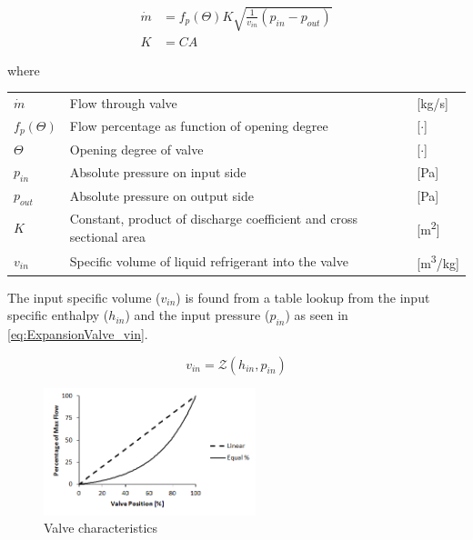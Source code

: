 \begin{equation} \label{eq:ExpansionValve_Alt}
	\begin{split}
		\dot{m} & = f_p(\Theta) K  \sqrt{\frac{1}{v_{in}} (p_{in} - p_{out})} \\
		K       & = C A
	\end{split}
\end{equation}

where

\begin{center}
	\begin{tabular}{l p{8cm} l}
		$\dot{m}$     & Flow through valve                                                  & [\si{kg}/\si{s}]   \\
		$f_p(\Theta)$ & Flow percentage as function of opening degree                       & [$\cdot$]          \\
		$ \Theta $    & Opening degree of valve                                             & [$ \cdot $]        \\
		$p_{in}$      & Absolute pressure on input side                                     & [\si{Pa}]          \\
		$p_{out}$     & Absolute pressure on output side                                    & [\si{Pa}]          \\
		$K$           & Constant, product of discharge coefficient and cross sectional area & [\si{m^2}]         \\
		$v_{in}$      & Specific volume of liquid refrigerant into the valve                & [\si{m^3}/\si{kg}]
	\end{tabular}
\end{center}

The input specific volume ($v_{in}$) is found from a table lookup from the input specific enthalpy ($h_{in}$) and the input pressure ($p_{in}$) as seen in \cref{eq:ExpansionValve_vin}.


\begin{equation} \label{eq:ExpansionValve_vin}
	v_{in} = \mathcal{Z}(h_{in}, p_{in})
\end{equation}


\begin{figure}[h]
	\centering
	\includegraphics[width=0.55\textwidth]{Graphics/Equal-percentage.png}
	\caption{Valve characteristics}
	\label{fig:equal_percent_valve}
\end{figure}


